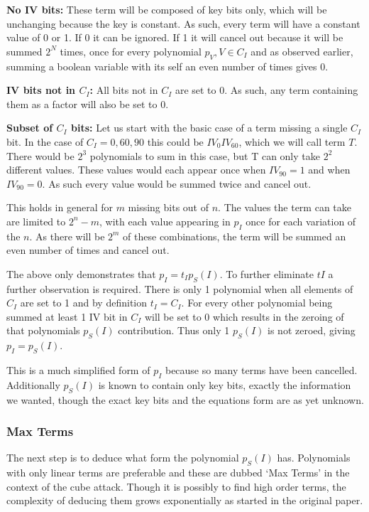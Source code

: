 \documentclass{report}
\let\Oldsubsubsection\subsubsection
\renewcommand{\subsubsection}{\FloatBarrier\Oldsubsubsection}
\begin{document}
\textbf{No IV bits:}
These term will be composed of key bits only, which will be unchanging because the key is constant. As such, every term will have a constant value of 0 or 1. If 0 it can be ignored. If 1 it will cancel out because it will be summed $2^N$ times, once for every polynomial $p_V, V \in C_I$ and as observed earlier, summing a boolean variable with its self an even number of times gives 0.

\textbf{IV bits not in $C_I$:}
All bits not in $C_I$ are set to 0. As such, any term containing them as a factor will also be set to 0.

\textbf{Subset of $C_I$ bits:}
Let us start with the basic case of a term missing a single $C_I$ bit. In the case of $C_I={0, 60, 90}$ this could be $IV_0IV_{60}$, which we will call term $T$. There would be $2^3$ polynomials to sum in this case, but T can only take $2^2$ different values. These values would each appear once when $IV_{90} = 1$ and when $IV_{90} = 0$. As such every value would be summed twice and cancel out.

This holds in general for $m$ missing bits out of $n$. The values the term can take are limited to $2^n-m$, with each value appearing in $p_I$ once for each variation of the $n$. As there will be $2^m$ of these combinations, the term will be summed an even number of times and cancel out. 

The above only demonstrates that $p_I=t_Ip_S(I)$. To further eliminate $tI$ a further observation is required. There is only 1 polynomial when all elements of $C_I$ are set to 1 and by definition $t_I=C_I$. For every other polynomial being summed at least 1 IV bit in $C_I$ will be set to 0 which results in the zeroing of that polynomials $p_S(I)$ contribution. Thus only 1 $p_S(I)$ is not zeroed, giving $p_I=p_S(I)$.

This is a much simplified form of $p_I$ because so many terms have been cancelled. Additionally $p_S(I)$ is known to contain only key bits, exactly the information we wanted, though the exact key bits and the equations form are as yet unknown.

\subsubsection{Max Terms}
The next step is to deduce what form the polynomial $p_S(I)$ has. Polynomials with only linear terms are preferable and these are dubbed `Max Terms' in the context of the cube attack. Though it is possibly to find high order terms, the complexity of deducing them grows exponentially as started in the original paper\cite{DinurShamir2009}.
\end{document}
